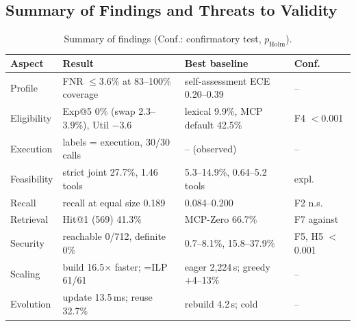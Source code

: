 \subsection{Summary of Findings and Threats to Validity}
\label{sec:ev-threats}

\begin{table}[t]
\centering
\caption{Summary of findings (Conf.: confirmatory test, $p_{\mathrm{Holm}}$).}
\label{tab:ev-answers}
\scriptsize
\setlength{\tabcolsep}{2pt}
\begin{tabular}{@{}lp{2.85cm}p{2.95cm}l@{}}
\toprule
Aspect & Result & Best baseline & Conf. \\
\midrule
Profile & FNR $\le$3.6\% at 83--100\% coverage & self-assessment ECE 0.20--0.39 & -- \\
Eligibility & Exp@5 0\% (swap 2.3--3.9\%), Util $-3.6$ & lexical 9.9\%, MCP default 42.5\% & F4 $<$0.001 \\
Execution & labels = execution, 30/30 calls & -- (observed) & -- \\
Feasibility & strict joint 27.7\%, 1.46 tools & 5.3--14.9\%, 0.64--5.2 tools & expl. \\
Recall & recall at equal size 0.189 & 0.084--0.200 & F2 n.s. \\
Retrieval & Hit@1 (569) 41.3\% & MCP-Zero 66.7\% & F7 against \\
Security & reachable 0/712, definite 0\% & 0.7--8.1\%, 15.8--37.9\% & F5, H5 $<$0.001 \\
Scaling & build 16.5$\times$ faster; =ILP 61/61 & eager 2,224\,s; greedy +4--13\% & -- \\
Evolution & update 13.5\,ms; reuse 32.7\% & rebuild 4.2\,s; cold & -- \\
\bottomrule
\end{tabular}
\end{table}

